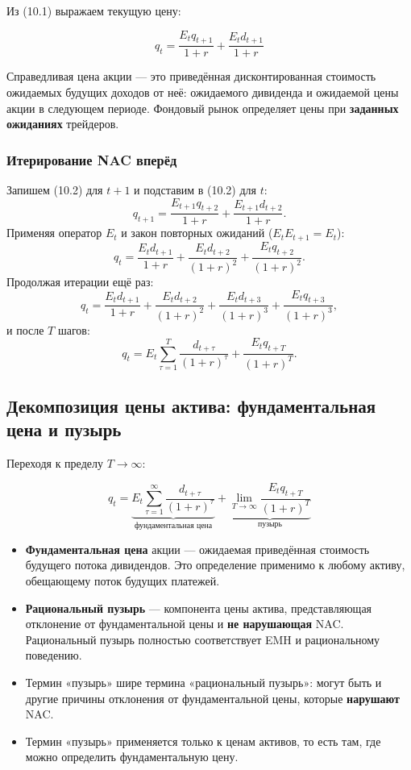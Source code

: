 \documentclass[10pt,a4paper]{article}
\begin{document}
Из (10.1) выражаем текущую цену:
\begin{formulabox}
\begin{equation}
q_t = \frac{E_t q_{t+1}}{1+r} + \frac{E_t d_{t+1}}{1+r} \tag{10.2}
\end{equation}
\end{formulabox}

\begin{intuition}
Справедливая цена акции — это приведённая дисконтированная стоимость ожидаемых будущих доходов от неё: ожидаемого дивиденда и ожидаемой цены акции в следующем периоде. Фондовый рынок определяет цены при \textbf{заданных ожиданиях} трейдеров.
\end{intuition}

\subsubsection{Итерирование NAC вперёд}

Запишем (10.2) для $t+1$ и подставим в (10.2) для $t$:
$$q_{t+1} = \frac{E_{t+1}q_{t+2}}{1+r} + \frac{E_{t+1}d_{t+2}}{1+r}.$$
Применяя оператор $E_t$ и закон повторных ожиданий ($E_tE_{t+1}=E_t$):
$$q_t = \frac{E_t d_{t+1}}{1+r} + \frac{E_t d_{t+2}}{(1+r)^2} + \frac{E_t q_{t+2}}{(1+r)^2}.$$
Продолжая итерации ещё раз:
$$q_t = \frac{E_t d_{t+1}}{1+r} + \frac{E_t d_{t+2}}{(1+r)^2} + \frac{E_t d_{t+3}}{(1+r)^3} + \frac{E_t q_{t+3}}{(1+r)^3},$$
и после $T$ шагов:
$$q_t = E_t\sum_{\tau=1}^{T}\frac{d_{t+\tau}}{(1+r)^\tau} + \frac{E_t q_{t+T}}{(1+r)^T}.$$

\subsection{Декомпозиция цены актива: фундаментальная цена и пузырь}

Переходя к пределу $T\to\infty$:
\begin{formulabox}
\begin{equation}
q_t = \underbrace{E_t\sum_{\tau=1}^{\infty}\frac{d_{t+\tau}}{(1+r)^\tau}}_{\text{фундаментальная цена}} + \underbrace{\lim_{T\to\infty}\frac{E_t q_{t+T}}{(1+r)^T}}_{\text{пузырь}} \tag{10.3}
\end{equation}
\end{formulabox}

\begin{itemize}[leftmargin=1.3em]
\item \textbf{Фундаментальная цена} акции — ожидаемая приведённая стоимость будущего потока дивидендов. Это определение применимо к любому активу, обещающему поток будущих платежей.
\item \textbf{Рациональный пузырь} — компонента цены актива, представляющая отклонение от фундаментальной цены и \textbf{не нарушающая} NAC. Рациональный пузырь полностью соответствует EMH и рациональному поведению.
\item Термин «пузырь» шире термина «рациональный пузырь»: могут быть и другие причины отклонения от фундаментальной цены, которые \textbf{нарушают} NAC.
\item Термин «пузырь» применяется только к ценам активов, то есть там, где можно определить фундаментальную цену.
\end{itemize}
\end{document}
